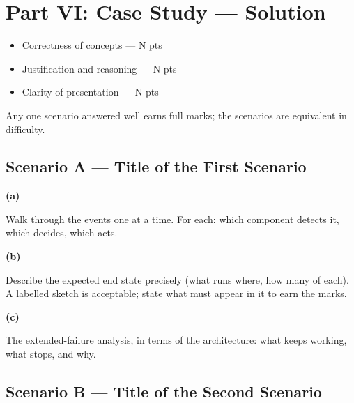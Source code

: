 %

\section*{Part VI: Case Study --- Solution}

\begin{keypoint}[Rubric]
\begin{itemize}
    \item Correctness of concepts --- N pts
    \item Justification and reasoning --- N pts
    \item Clarity of presentation --- N pts
\end{itemize}
Any one scenario answered well earns full marks; the scenarios are equivalent
in difficulty.
\end{keypoint}

\subsection*{Scenario A --- Title of the First Scenario}

\textbf{(a)}
\begin{ans}
Walk through the events one at a time. For each: which component detects it,
which decides, which acts.
\end{ans}

\textbf{(b)}
\begin{ans}
Describe the expected end state precisely (what runs where, how many of each).
A labelled sketch is acceptable; state what must appear in it to earn the marks.
\end{ans}

\textbf{(c)}
\begin{ans}
The extended-failure analysis, in terms of the architecture: what keeps
working, what stops, and why.
\end{ans}

\subsection*{Scenario B --- Title of the Second Scenario}

